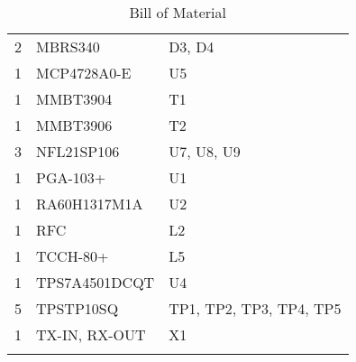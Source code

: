 \begin{longtable}{l|l|l}
	2   & MBRS340       & D3, D4                                                       \\
	1   & MCP4728A0-E   & U5                                                           \\
	1   & MMBT3904      & T1                                                           \\
	1   & MMBT3906      & T2                                                           \\
	3   & NFL21SP106    & U7, U8, U9                                                   \\
	1   & PGA-103+      & U1                                                           \\
	1   & RA60H1317M1A  & U2                                                           \\
	1   & RFC           & L2                                                           \\
	1   & TCCH-80+      & L5                                                           \\
	1   & TPS7A4501DCQT & U4                                                           \\
	5   & TPSTP10SQ     & TP1, TP2, TP3, TP4, TP5                                      \\
	1   & TX-IN, RX-OUT & X1         												   \\
	
	\caption{Bill of Material}                                                 
\end{longtable}